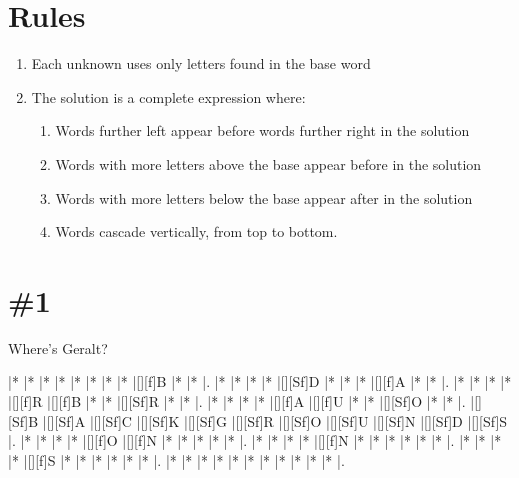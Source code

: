 \documentclass[letterpaper]{article}
\begin{document}
\vspace*{-4cm}
\section*{Rules}

\begin{enumerate}
    \item Each unknown uses only letters found in the base word
    \item The solution is a complete expression where:
    \begin{enumerate}
        \item Words further left appear before words further right in the solution
        \item Words with more letters above the base appear before in the solution
        \item Words with more letters below the base appear after in the solution
        \item Words cascade vertically, from top to bottom.
    \end{enumerate}
\end{enumerate}

\section*{\#1}
Where's Geralt?
\vspace*{1em}
\begin{Puzzle}{11}{9}
|*        |*        |*        |*        |*        |*        |*        |*        |[][f]B   |*        |*        |. 
|*        |*        |*        |*        |[][Sf]D  |*        |*        |*        |[][f]A   |*        |*        |.  
|*        |*        |*        |*        |[][f]R   |[][f]B   |*        |*        |[][Sf]R  |*        |*        |.
|*        |*        |*        |*        |[][f]A   |[][f]U   |*        |*        |[][Sf]O  |*        |*        |.  
|[][Sf]B  |[][Sf]A  |[][Sf]C  |[][Sf]K  |[][Sf]G  |[][Sf]R  |[][Sf]O  |[][Sf]U  |[][Sf]N  |[][Sf]D  |[][Sf]S  |.
|*        |*        |*        |*        |[][f]O   |[][f]N   |*        |*        |*        |*        |*        |. 
|*        |*        |*        |*        |[][f]N   |*        |*        |*        |*        |*        |*        |.
|*        |*        |*        |*        |[][f]S   |*        |*        |*        |*        |*        |*        |.
|*        |*        |*        |*        |*        |*        |*        |*        |*        |*        |*        |.
\end{Puzzle}
\end{document}
